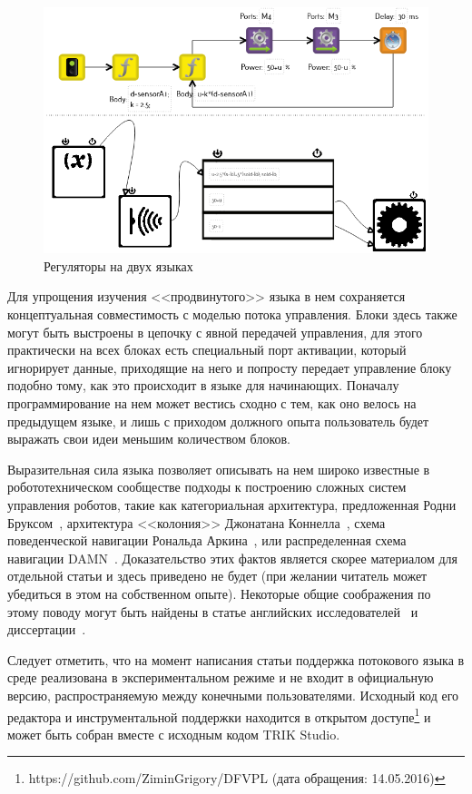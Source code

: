 \documentclass[a5paper]{article}
\begin{document}
\begin{figure}[ht]
    \centering
    \includegraphics[width=4.5in]{TS_AlongTheBox_Comparison.png}
    \caption{Регуляторы на двух языках}
    \label{image:alongTheBox_CF_DF}
\end{figure}

Для упрощения изучения <<продвинутого>> языка в нем сохраняется концептуальная совместимость с моделью потока управления. Блоки здесь также могут быть выстроены в цепочку с явной передачей управления, для этого практически на всех блоках есть специальный порт активации, который игнорирует данные, приходящие на него и попросту передает управление блоку подобно тому, как это происходит в языке для начинающих. Поначалу программирование на нем может вестись сходно с тем, как оно велось на предыдущем языке, и лишь с приходом должного опыта пользователь будет выражать свои идеи меньшим количеством блоков. 

Выразительная сила языка позволяет описывать на нем широко известные в робототехническом сообществе подходы к построению сложных систем управления роботов, такие как категориальная архитектура, предложенная Родни Бруксом~\cite{brooks1986robust}, архитектура <<колония>> Джонатана Коннелла~\cite{connell1989colony}, схема поведенческой навигации Рональда Аркина~\cite{arkin1987motor}, или распределенная схема навигации DAMN~\cite{rosenblatt1997damn}. Доказательство этих фактов является скорее материалом для отдельной статьи и здесь приведено не будет (при желании читатель может убедиться в этом на собственном опыте). Некоторые общие соображения по этому поводу могут быть найдены в статье английских исследователей~\cite{simpson2009toward} и диссертации~\cite{banyasad2000visual}.

Следует отметить, что на момент написания статьи поддержка потокового языка в среде реализована в экспериментальном режиме и не входит в официальную версию, распространяемую между конечными пользователями. Исходный код его редактора и инструментальной поддержки находится в открытом доступе\footnote{https://github.com/ZiminGrigory/DFVPL (дата обращения: 14.05.2016)} и может быть собран вместе с исходным кодом TRIK Studio.
\end{document}
